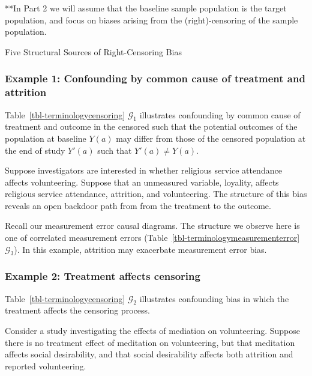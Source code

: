 \documentclass[
  single column]{article}
\begin{document}
**In Part 2 we will assume that the baseline sample population is the
target population, and focus on biases arising from the
(right)-censoring of the sample population.

\begin{table}

\caption{\label{tbl-terminologycensoring}Five Structural Sources of
Right-Censoring Bias}

\centering{

\terminologycensoring

}

\end{table}%

\subsubsection{Example 1: Confounding by common cause of treatment and
attrition}\label{example-1-confounding-by-common-cause-of-treatment-and-attrition}

Table~\ref{tbl-terminologycensoring} \(\mathcal{G}_1\) illustrates
confounding by common cause of treatment and outcome in the censored
such that the potential outcomes of the population at baseline \(Y(a)\)
may differ from those of the censored population at the end of study
\(Y'(a)\) such that \(Y'(a) \neq Y(a)\).

Suppose investigators are interested in whether religious service
attendance affects volunteering. Suppose that an unmeasured variable,
loyality, affects religious service attendance, attrition, and
volunteering. The structure of this bias reveals an open backdoor path
from from the treatment to the outcome.

Recall our measurement error causal diagrams. The structure we observe
here is one of correlated measurement errors
(Table~\ref{tbl-terminologymeasurementerror} \(\mathcal{G}_3\)). In this
example, attrition may exacerbate measurement error bias.

\subsubsection{Example 2: Treatment affects
censoring}\label{example-2-treatment-affects-censoring}

Table~\ref{tbl-terminologycensoring} \(\mathcal{G}_2\) illustrates
confounding bias in which the treatment affects the censoring process.

Consider a study investigating the effects of mediation on volunteering.
Suppose there is no treatment effect of meditation on volunteering, but
that meditation affects social desirability, and that social
desirability affects both attrition and reported volunteering.
\end{document}
